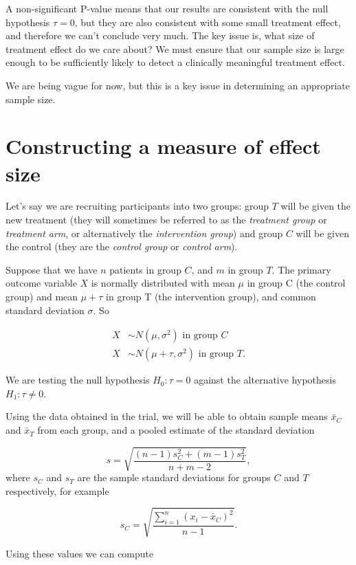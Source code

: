 \documentclass[
  openany]{book}
\theoremstyle{definition}
\theoremstyle{definition}
\theoremstyle{definition}
\theoremstyle{definition}
\theoremstyle{remark}
\begin{document}
A non-significant P-value means that our results are consistent with the null hypothesis \(\tau=0\), but they are also consistent with some small treatment effect, and therefore we can't conclude very much. The key issue is, what size of treatment effect do we care about? We must ensure that our sample size is large enough to be sufficiently likely to detect a clinically meaningful treatment effect.

We are being vague for now, but this is a key issue in determining an appropriate sample size.

\section{Constructing a measure of effect size}\label{sec-measDcont}

Let's say we are recruiting participants into two groups: group \(T\) will be given the new treatment (they will sometimes be referred to as the \emph{treatment group} or \emph{treatment arm}, or alternatively the \emph{intervention group}) and group \(C\) will be given the control (they are the \emph{control group} or \emph{control arm}).

Suppose that we have \(n\) patients in group \(C\), and \(m\) in group \(T\). The primary outcome variable \(X\) is normally distributed with mean \(\mu\) in group C (the control group) and mean \(\mu+\tau\) in group T (the intervention group), and common standard deviation \(\sigma\). So

\begin{align*}
X & \sim N\left(\mu, \sigma^2\right) \text{ in group }C\\
X & \sim N\left(\mu + \tau, \sigma^2\right) \text{ in group }T.
\end{align*}

We are testing the null hypothesis \(H_0: \tau=0\) against the alternative hypothesis \(H_1: \tau\neq{0}\).

Using the data obtained in the trial, we will be able to obtain sample means \(\bar{x}_C\) and \(\bar{x}_T\) from each group, and a pooled estimate of the standard deviation

\[ s = \sqrt{\frac{\left(n-1\right)s_C^2 + (m-1)s_T^2}{n+m - 2}},
\]
where \(s_C\) and \(s_T\) are the sample standard deviations for groups \(C\) and \(T\) respectively, for example

\[
s_C = \sqrt{\frac{\sum\limits_{i=1}^n{\left(x_i - \bar{x}_C\right)^2}}{n-1}}.
\]

Using these values we can compute
\end{document}
